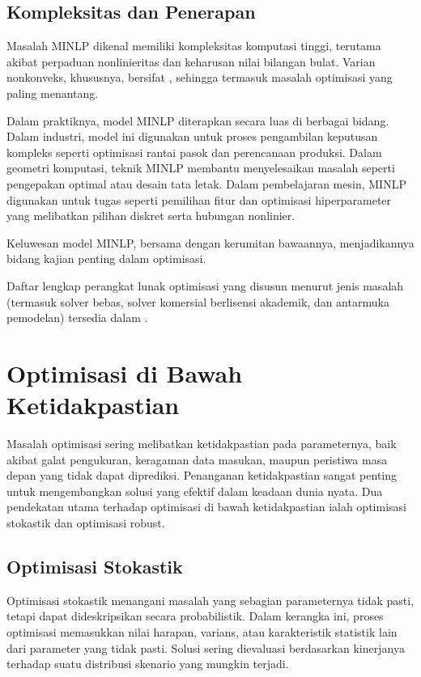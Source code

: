 \subsection*{Kompleksitas dan Penerapan}
Masalah MINLP dikenal memiliki kompleksitas komputasi tinggi, terutama akibat perpaduan nonlinieritas dan keharusan nilai bilangan bulat. Varian nonkonveks, khususnya, bersifat \nphard, sehingga termasuk masalah optimisasi yang paling menantang.

Dalam praktiknya, model MINLP diterapkan secara luas di berbagai bidang. Dalam industri, model ini digunakan untuk proses pengambilan keputusan kompleks seperti optimisasi rantai pasok dan perencanaan produksi. Dalam geometri komputasi, teknik MINLP membantu menyelesaikan masalah seperti pengepakan optimal atau desain tata letak. Dalam pembelajaran mesin, MINLP digunakan untuk tugas seperti pemilihan fitur dan optimisasi hiperparameter yang melibatkan pilihan diskret serta hubungan nonlinier.

Keluwesan model MINLP, bersama dengan kerumitan bawaannya, menjadikannya bidang kajian penting dalam optimisasi.

Daftar lengkap perangkat lunak optimisasi yang disusun menurut jenis masalah (termasuk solver bebas, solver komersial berlisensi akademik, dan antarmuka pemodelan) tersedia dalam \OOSoftwareAppendixReference.

\section{Optimisasi di Bawah Ketidakpastian}

Masalah optimisasi sering melibatkan ketidakpastian pada parameternya, baik akibat galat pengukuran, keragaman data masukan, maupun peristiwa masa depan yang tidak dapat diprediksi. Penanganan ketidakpastian sangat penting untuk mengembangkan solusi yang efektif dalam keadaan dunia nyata. Dua pendekatan utama terhadap optimisasi di bawah ketidakpastian ialah optimisasi stokastik dan optimisasi robust.

\subsection{Optimisasi Stokastik}

Optimisasi stokastik menangani masalah yang sebagian parameternya tidak pasti, tetapi dapat dideskripsikan secara probabilistik. Dalam kerangka ini, proses optimisasi memasukkan nilai harapan, varians, atau karakteristik statistik lain dari parameter yang tidak pasti. Solusi sering dievaluasi berdasarkan kinerjanya terhadap suatu distribusi skenario yang mungkin terjadi. 

